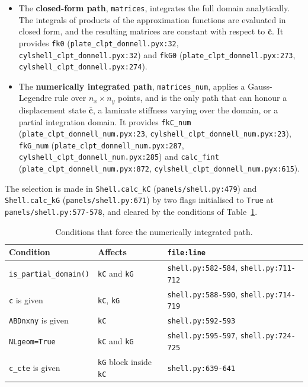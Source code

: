 \begin{itemize}
	\item The \textbf{closed-form path}, \texttt{matrices}, integrates the full domain analytically. The integrals of products of the approximation functions are evaluated in closed form, and the resulting matrices are constant with respect to $\bar{\boldsymbol{c}}$. It provides \texttt{fk0} (\texttt{plate\_clpt\_donnell.pyx:32}, \texttt{cylshell\_clpt\_donnell.pyx:32}) and \texttt{fkG0} (\texttt{plate\_clpt\_donnell.pyx:273}, \texttt{cylshell\_clpt\_donnell.pyx:274}).
	\item The \textbf{numerically integrated path}, \texttt{matrices\_num}, applies a Gauss-Legendre rule over $n_x \times n_y$ points, and is the only path that can honour a displacement state $\bar{\boldsymbol{c}}$, a laminate stiffness varying over the domain, or a partial integration domain. It provides \texttt{fkC\_num} (\texttt{plate\_clpt\_donnell\_num.pyx:23}, \texttt{cylshell\_clpt\_donnell\_num.pyx:23}), \texttt{fkG\_num} (\texttt{plate\_clpt\_donnell\_num.pyx:287}, \texttt{cylshell\_clpt\_donnell\_num.pyx:285}) and \texttt{calc\_fint} (\texttt{plate\_clpt\_donnell\_num.pyx:872}, \texttt{cylshell\_clpt\_donnell\_num.pyx:615}).
\end{itemize}

The selection is made in \texttt{Shell.calc\_kC} (\texttt{panels/shell.py:479}) and \texttt{Shell.calc\_kG} (\texttt{panels/shell.py:671}) by two flags initialised to \texttt{True} at \texttt{panels/shell.py:577-578}, and cleared by the conditions of Table~\ref{tab:tangent-donnell-dispatch}.

\begin{table}[!htbp]
	\centering
	\caption[]{Conditions that force the numerically integrated path.}
	\label{tab:tangent-donnell-dispatch}
	\renewcommand{\arraystretch}{1.3}
	\begin{tabular}{lll}
		\toprule
		Condition & Affects & \texttt{file:line} \\
		\midrule
		\texttt{is\_partial\_domain()} & \texttt{kC} and \texttt{kG} & \texttt{shell.py:582-584}, \texttt{shell.py:711-712} \\
		\texttt{c} is given & \texttt{kC}, \texttt{kG} & \texttt{shell.py:588-590}, \texttt{shell.py:714-719} \\
		\texttt{ABDnxny} is given & \texttt{kC} & \texttt{shell.py:592-593} \\
		\texttt{NLgeom=True} & \texttt{kC} and \texttt{kG} & \texttt{shell.py:595-597}, \texttt{shell.py:724-725} \\
		\texttt{c\_cte} is given & \texttt{kG} block inside \texttt{kC} & \texttt{shell.py:639-641} \\
		\bottomrule
	\end{tabular}
\end{table}


